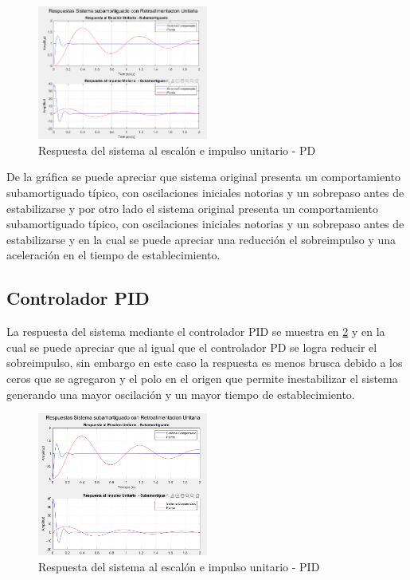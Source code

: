 \documentclass[conference]{IEEEtran}
\begin{document}
	\begin{figure}[h]
		\centering
		\includegraphics[width=0.5\textwidth]{media1/respuesta-sistema.png}
		\caption{Respuesta del sistema al escalón e impulso unitario - PD}
		\label{fig:respuesta-sistema}
	\end{figure}
	De la gráfica se puede apreciar que sistema original presenta un comportamiento subamortiguado típico, con oscilaciones iniciales notorias y un sobrepaso antes de estabilizarse y por otro lado el sistema original presenta un comportamiento subamortiguado típico, con oscilaciones iniciales notorias y un sobrepaso antes de estabilizarse y en la cual se puede apreciar una reducción el sobreimpulso y una aceleración en el tiempo de establecimiento.
	
	\subsection{Controlador PID}
	La respuesta del sistema mediante el controlador PID se muestra en \ref{fig:respuesta-sistema-pid} y en la cual se puede apreciar que al igual que el controlador PD se logra reducir el sobreimpulso, sin embargo en este caso la respuesta es menos brusca debido a los ceros que se agregaron y el polo en el origen que permite inestabilizar el sistema generando una mayor oscilación y un mayor tiempo de establecimiento.
	\begin{figure}[h]
		\centering
		\includegraphics[width=0.5\textwidth]{media1/respuesta-sistema-pid.png}
		\caption{Respuesta del sistema al escalón e impulso unitario - PID}
		\label{fig:respuesta-sistema-pid}
	\end{figure}
	
	
\end{document}
